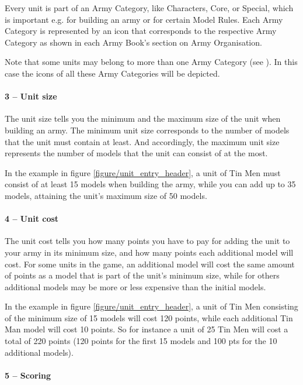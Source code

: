 Every unit is part of an Army Category, like Characters, Core, or Special, which is important e.g. for building an army or for certain Model Rules. Each Army Category is represented by an icon that corresponds to the respective Army Category as shown in each Army Book's section on Army Organisation.

Note that some units may belong to more than one Army Category (see ). In this case the icons of all these Army Categories will be depicted.

\paragraph{3 -- Unit size}

The unit size tells you the minimum and the maximum size of the unit when building an army. The minimum unit size corresponds to the number of models that the unit must contain at least. And accordingly, the maximum unit size represents the number of models that the unit can consist of at the most.

In the example in figure \ref{figure/unit_entry_header}, a unit of Tin Men must consist of at least 15 models when building the army, while you can add up to 35 models, attaining the unit's maximum size of 50 models.

\paragraph{4 -- Unit cost}

The unit cost tells you how many points you have to pay for adding the unit to your army in its minimum size, and how many points each additional model will cost. For some units in the game, an additional model will cost the same amount of points as a model that is part of the unit's minimum size, while for others additional models may be more or less expensive than the initial models.

In the example in figure \ref{figure/unit_entry_header}, a unit of Tin Men consisting of the minimum size of 15 models will cost 120 points, while each additional Tin Man model will cost 10 points. So for instance a unit of 25 Tin Men will cost a total of 220 points (120 points for the first 15 models and 100 pts for the 10 additional models).

\paragraph{5 -- Scoring}


